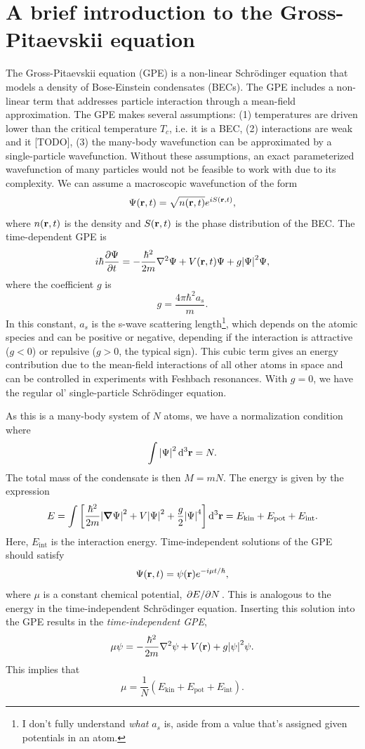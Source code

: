 \documentclass{homework}
\begin{document}
	\section{A brief introduction to the Gross-Pitaevskii equation}
	The Gross-Pitaevskii equation (GPE) is a non-linear Schr\"odinger equation that models a density of Bose-Einstein condensates (BECs). The GPE includes a non-linear term that addresses particle interaction through a mean-field approximation. 
	The GPE makes several assumptions: (1) temperatures are driven lower than the critical temperature $T_c$, i.e. it is a BEC, (2) interactions are weak and it [TODO], (3) the many-body wavefunction can be approximated by a single-particle wavefunction. Without these assumptions, an exact parameterized wavefunction of many particles would not be feasible to work with due to its complexity. We can assume a macroscopic wavefunction of the form
	$$\Psi(\boldsymbol{\mathrm{r}}, t) = \sqrt{n(\boldsymbol{\mathrm{r}}, t)} e^{iS(\boldsymbol{\mathrm{r}}, t)},$$
	where $n(\boldsymbol{\mathrm{r}}, t)$ is the density and $S(\boldsymbol{\mathrm{r}}, t)$ is the phase distribution of the BEC.
	The time-dependent GPE is
	$$i \hbar \pdv{\Psi}{t} = - \frac{\hbar^2}{2m} \laplacian{\Psi} + V(\bvec{r}, t) \Psi + g \abs{\Psi}^2 \Psi,$$
	where the coefficient $g$ is
	$$g = \frac{4 \pi \hbar^2 a_s}{m}.$$
	In this constant, $a_s$ is the s-wave scattering length\footnote{I don't fully understand \textit{what} $a_s$ is, aside from a value that's assigned given potentials in an atom.}, which depends on the atomic species and can be positive or negative, depending if the interaction is attractive ($g<0$) or repulsive ($g>0$, the typical sign). This cubic term gives an energy contribution due to the mean-field interactions of all other atoms in space and can be controlled in experiments with Feshbach resonances. With $g=0$, we have the regular ol' single-particle Schr\"odinger equation. 
	
	As this is a many-body system of $N$ atoms, we have a normalization condition where 
	$$\int \abs{\Psi}^2 \dd[3]{ \boldsymbol{\mathrm{r}} } = N.$$
	The total mass of the condensate is then $M=mN$. The energy is given by the expression
	$$E = \int \left[ \frac{\hbar^2}{2m} \abs{\grad{\Psi}}^2 + V\abs{\Psi}^2 + \frac{g}{2} \abs{\Psi}^4\right] \dd[3]{ \boldsymbol{\mathrm{r}} } = E_\mathrm{kin} + E_\mathrm{pot} + E_\mathrm{int}.$$ Here, $E_\mathrm{int}$ is the interaction energy. Time-independent solutions of the GPE should satisfy
		$$\Psi(\boldsymbol{\mathrm{r}}, t) = \psi(\boldsymbol{\mathrm{r}}) e^{-i \mu t / \hbar},$$
	where $\mu$ is a constant chemical potential, $\pdv*{E}{N}$.
	This is analogous to the energy in the time-independent Schr\"odinger equation. Inserting this solution into the GPE results in the \textit{time-independent GPE}, 
	$$\mu \psi = -\frac{\hbar^2}{2 m} \laplacian{\psi} + V(\bvec{r}) + g \abs{\psi}^2 \psi.$$
	This implies that $$\mu = \frac{1}{N} \left( E_\mathrm{kin} + E_\mathrm{pot} + E_\mathrm{int}\right).$$
	
\end{document}
